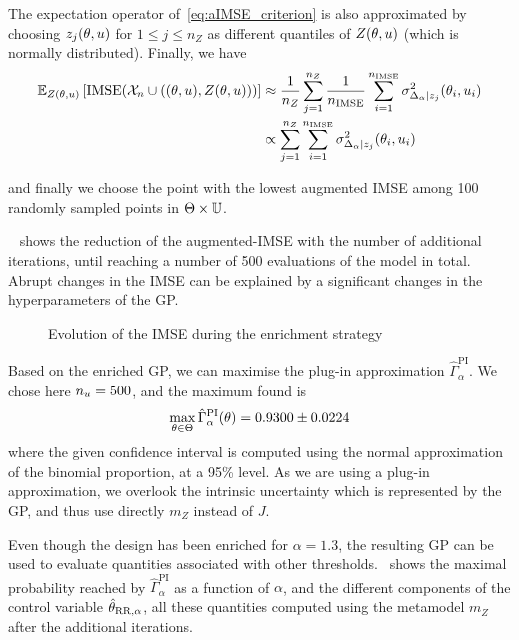 \documentclass[../../Main_ManuscritThese.tex]{subfiles}
\newcommand\imgpath{/home/victor/acadwriting/Manuscrit/Text/Chapter5/img/}
\begin{document}
The expectation operator of~\cref{eq:aIMSE_criterion} is also
approximated by choosing $z_j(\theta, u)$ for $1\leq j \leq n_Z$ as
different quantiles of $Z(\theta, u)$ (which is normally distributed). Finally, we have
\begin{align}
  \mathbb{E}_{Z(\theta, u)}\left[\operatorname{\mathrm{IMSE}}(\mathcal{X}_n \cup \left((\theta, u), Z(\theta, u)\right))\right] &\approx \frac{1}{n_Z} \sum_{j=1}^{n_Z} \frac{1}{n_{\operatorname{\mathrm{IMSE}}}} \sum_{i=1}^{n_{\operatorname{\mathrm{IMSE}}}} \sigma^2_{\Delta_{\alpha} \mid z_j}(\theta_i, u_i) \\
   &\propto \sum_{j=1}^{n_Z} \sum_{i=1}^{n_{\operatorname{\mathrm{IMSE}}}} \sigma^2_{\Delta_{\alpha} \mid z_j}(\theta_i, u_i)
\end{align}

and finally we choose the point with the lowest augmented IMSE among
\num{100} randomly sampled points in $\Theta\times\mathbb{U}$.

~ shows the reduction of the augmented-IMSE with the number of
additional iterations, until reaching a number of \num{500}
evaluations of the model in total. Abrupt changes in the IMSE can be
explained by a significant changes in the hyperparameters of the GP.\@

\begin{figure}[ht]
  \centering
  
  \caption{\label{fig:aIMSE} Evolution of the IMSE during the
    enrichment strategy}
\end{figure}


Based on the enriched GP, we can maximise the plug-in approximation
$\hat{\Gamma}_{\alpha}^{\mathrm{PI}}$. We chose here
$n_{u}=\num{500}$, and the maximum found is
\begin{equation}
  \label{eq:max_gamma_alpha}
  \max_{\kk\in\Kspace} \hat{\Gamma}_{\alpha}^{\mathrm{PI}}(\kk) = \num[separate-uncertainty=true]{0.93\pm 0.0224}
\end{equation}
where the given confidence interval is computed using the normal
approximation of the binomial proportion, at a \num{95}\% level. As we
are using a plug-in approximation, we overlook the intrinsic
uncertainty which is represented by the GP, and thus use directly
$m_Z$ instead of $J$.

Even though the design has been enriched for $\alpha=1.3$, the
resulting GP can be used to evaluate quantities associated with
other thresholds.~ shows the maximal
probability reached by $\hat{\Gamma}^{\mathrm{PI}}_{\alpha}$ as a
function of $\alpha$, and the different components of the control
variable $\hat{\theta}_{\mathrm{RR},\alpha}$, all these quantities
computed using the metamodel $m_Z$ after the additional iterations.
\end{document}

